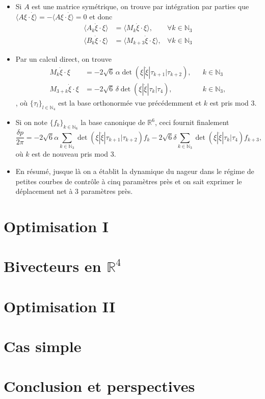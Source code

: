 \documentclass[10pt,a4paper]{article}
\theoremstyle{plain}
\theoremstyle{plain}
\theoremstyle{plain}
\theoremstyle{definition}
\theoremstyle{definition}
\theoremstyle{definition}
\theoremstyle{plain}
\newcommand{\N}{\mathbb{N}}
\newcommand{\R}{\mathbb{R}}
\begin{document}
\begin{itemize}
\item Si $A$ est une matrice symétrique, on trouve par intégration par parties que $\langle A \xi \cdot \dot{\xi} \rangle = - \langle A \xi \cdot \dot{\xi} \rangle = 0$ et donc
\begin{align}
\langle A_k \dot{\xi} \cdot \xi \rangle &= \langle M_k \dot{\xi} \cdot \xi \rangle, &\forall k \in \N_3\\
\langle B_k \dot{\xi} \cdot \xi \rangle &= \langle M_{k + 3} \dot{\xi} \cdot \xi \rangle, &\forall k \in \N_3
\end{align}

\item Par un calcul direct, on trouve
\begin{align}
  M_k \dot{\xi} \cdot \xi &= - 2 \sqrt{6} \,\alpha \det( \xi | \dot{\xi} | \tau_{k+1} | \tau_{k+2}), & & k \in \N_3 \\
  M_{3 + k} \dot{\xi} \cdot \xi &= - 2 \sqrt{6} \,\delta \det ( \xi | \dot{\xi} | \tau_{k} | \tau_{4}), & & k \in \N_3,
\end{align},
où $\{\tau_l\}_{l \in \N_4}$ est la base orthonormée vue précédemment et $k$ est pris mod 3.

\item Si on note $\{f_k\}_{k \in \N_6}$ la base canonique de $\R^6$, ceci fournit finalement
\begin{equation}
\label{eq: net displacement}
\frac{\delta p}{2 \pi}= - 2  \sqrt{6} \alpha \sum_{k \in \N_3} \det( \xi | \dot{\xi} | \tau_{k+1} | \tau_{k+2}) f_k  - 2  \sqrt{6} \delta \sum_{k \in \N_3} \det ( \xi | \dot{\xi} | \tau_{k} | \tau_{4}) f_{k + 3},
\end{equation}
où $k$ est de nouveau pris mod 3.

\item En résumé, jusque là on a établit la dynamique du nageur dans le régime de petites courbes de contrôle à cinq paramètres près et on sait exprimer le déplacement net à 3 paramètres près.
\end{itemize}

\section{Optimisation I}


\section{Bivecteurs en $\R^4$}


\section{Optimisation II}


\section{Cas simple}


\section{Conclusion et perspectives}


\printbibliography
\end{document}
